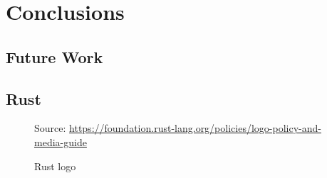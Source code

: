 \chapter{Conclusions}
\label{cha:conclusions}

\section{Future Work}
\label{sec:conclusions_future_work}



\section{Rust}
\label{sec:conclusions_rust}

\begin{figure} %
  \centering
  \def\stackalignment{r} %
  {\scriptsize \parbox[t]{\linewidth}{ Source: \url{https://foundation.rust-lang.org/policies/logo-policy-and-media-guide}} }
  \caption{Rust logo}
\end{figure}